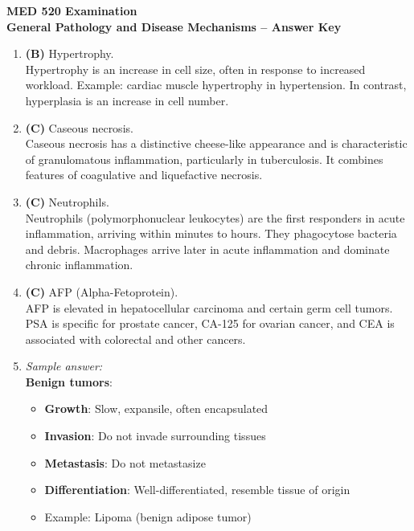 \documentclass[11pt]{article}
\begin{document}
\begin{center}
  {\Large \textbf{MED 520 Examination}}\\[0.25em]
  {\large \textbf{General Pathology and Disease Mechanisms -- Answer Key}}\\[0.5em]
\end{center}

\begin{enumerate}[label=\textbf{\arabic*.}]

  \item \textbf{(B)} Hypertrophy.\\
  Hypertrophy is an increase in cell size, often in response to increased workload. Example: cardiac 
  muscle hypertrophy in hypertension. In contrast, hyperplasia is an increase in cell number.

  \item \textbf{(C)} Caseous necrosis.\\
  Caseous necrosis has a distinctive cheese-like appearance and is characteristic of granulomatous 
  inflammation, particularly in tuberculosis. It combines features of coagulative and liquefactive 
  necrosis.

  \item \textbf{(C)} Neutrophils.\\
  Neutrophils (polymorphonuclear leukocytes) are the first responders in acute inflammation, arriving 
  within minutes to hours. They phagocytose bacteria and debris. Macrophages arrive later in acute 
  inflammation and dominate chronic inflammation.

  \item \textbf{(C)} AFP (Alpha-Fetoprotein).\\
  AFP is elevated in hepatocellular carcinoma and certain germ cell tumors. PSA is specific for 
  prostate cancer, CA-125 for ovarian cancer, and CEA is associated with colorectal and other cancers.

  \item \emph{Sample answer:}\\
  \textbf{Benign tumors}:
  \begin{itemize}
    \item \textbf{Growth}: Slow, expansile, often encapsulated
    \item \textbf{Invasion}: Do not invade surrounding tissues
    \item \textbf{Metastasis}: Do not metastasize
    \item \textbf{Differentiation}: Well-differentiated, resemble tissue of origin
    \item Example: Lipoma (benign adipose tumor)
  \end{itemize}


\end{enumerate}
\end{document}
